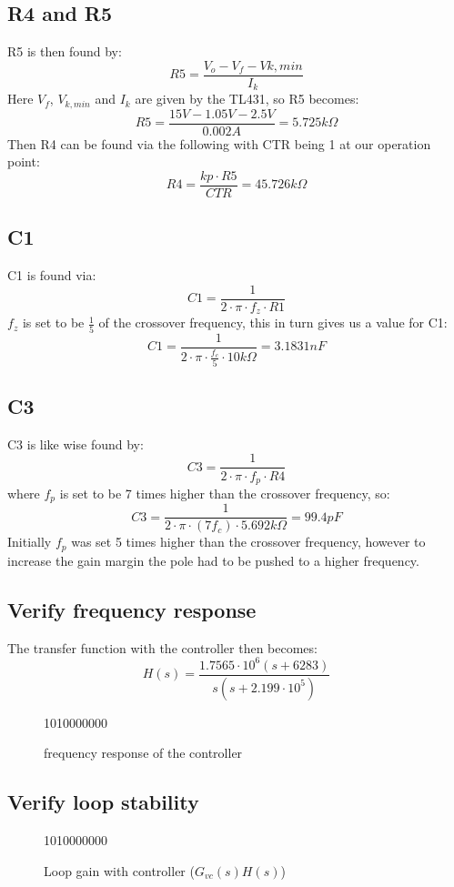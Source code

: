 \subsection{R4 and R5}
R5 is then found by:
\[
R5= \frac{V_o - V_f - V{k,min}}{I_k}
\]
Here $V_f$, $V_{k,min}$ and $I_k$ are given by the TL431, so R5 becomes:
\[
R5 = \frac{15V - 1.05V - 2.5V}{0.002A} = 5.725 k\Omega
\]
Then R4 can be found via the following with CTR being 1 at our operation point:%
\[
R4 = \frac{kp \cdot R5}{CTR} = 45.726k\Omega
\]
\subsection{C1}
C1 is found via:
\[
C1=\frac{1}{2\cdot\pi\cdot f_z \cdot R1}
\]
$f_z$ is set to be $\frac{1}{5}$ of the crossover frequency, this in turn gives us a value for C1:
\[
C1 = \frac{1}{2\cdot\pi\cdot \frac{f_c}{5} \cdot 10k\Omega} = 3.1831 nF
\]
\subsection{C3}
C3 is like wise found by:
\[
C3 = \frac{1}{2\cdot\pi\cdot f_p \cdot R4}
\]
where $f_p$ is set to be 7 times higher than the crossover frequency, so:
\[
C3 = \frac{1}{2\cdot\pi\cdot (7f_c) \cdot 5.692k\Omega}=99.4 pF
\]
Initially $f_p$ was set 5 times higher than the crossover frequency, however to increase the gain margin the pole had to be pushed to a higher frequency.

\subsection{Verify frequency response}
The transfer function with the controller then becomes:
\[
H(s)=\frac{1.7565\cdot10^6(s + 6283)}{s(s+2.199\cdot10^5)}
\]
\begin{figure}[H]
    \centering
    {10}{10000000}
    \caption{frequency response of the controller}
    \label{fig:bp2}
\end{figure}
\subsection{Verify loop stability}

\begin{figure}[H]
    \centering
    {10}{10000000}
    \caption{Loop gain with controller ($G_{vc}(s)H(s)$)}
    \label{fig:bp3}
\end{figure}

